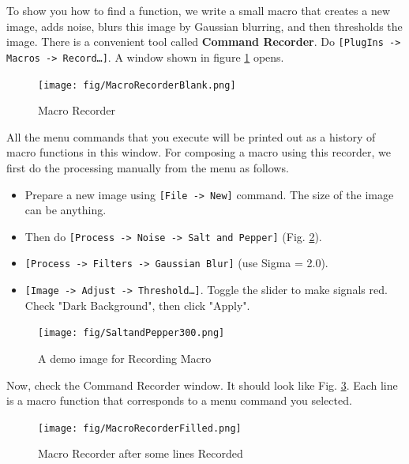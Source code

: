 \documentclass[11pt,a4paper,oneside]{report}
\newcommand{\ijmenu}[1]{\texttt{\small#1}}
\begin{document}
To show you how to find a function, we write a small macro that creates a new image, adds noise, blurs this image by Gaussian blurring, and then thresholds the image. There is a convenient tool called \textbf{Command Recorder}. 
Do \ijmenu{[PlugIns -> Macros -> Record\ldots]}. A window shown in figure
\ref{fig_macroRecorderBlank} opens.

\begin{figure}[htbp]
\begin{center}
\texttt{[image: fig/MacroRecorderBlank.png]}
\caption{Macro Recorder} \label{fig_macroRecorderBlank}
\end{center}
\end{figure}

All the menu commands that you execute will be printed out as a history of macro functions in this window. For composing a macro using this recorder, we first do the processing manually from the menu as follows. 
\begin{itemize}
  \item Prepare a new image using \ijmenu{[File -> New]} command. The size of the image can be anything.
  \item Then do \ijmenu{[Process -> Noise -> Salt and Pepper]} (Fig.
  \ref{fig_SaltAndPepper}).
  \item \ijmenu{[Process -> Filters -> Gaussian Blur]} (use Sigma = 2.0).
  \item \ijmenu{[Image -> Adjust -> Threshold\ldots]}. Toggle the slider to make
  signals red. Check "Dark Background", then click "Apply".
\end{itemize}
 
\begin{figure}[htbp]
\begin{center}
\texttt{[image: fig/SaltandPepper300.png]}
\caption{A demo image for Recording Macro} 
\label{fig_SaltAndPepper}
\end{center}
\end{figure}

Now, check the Command Recorder window. 
It should look like Fig. \ref{fig_macroRecorderFilled}. 
Each line is a macro function that corresponds to a menu command you selected.

\begin{figure}[htbp]
\begin{center}
\texttt{[image: fig/MacroRecorderFilled.png]}
\caption{Macro Recorder after some lines Recorded} 
\label{fig_macroRecorderFilled}
\end{center}
\end{figure}
\end{document}
